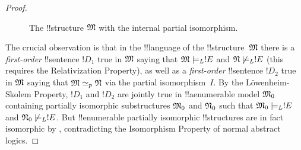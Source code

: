\documentclass[../../include/open-logic-section]{subfiles}
\begin{document}
\begin{proof}
\begin{figure}[h]
  \centering
  \caption{The !!{structure} $\mathfrak M$ with the internal
    partial isomorphism.}
\end{figure}

The crucial observation is that in the !!{language} of the
!!{structure}~$\mathfrak M$ there is a \emph{first-order} !!{sentence} $!D_1$
true in $\mathfrak M$ saying that $\mathfrak M \models_L !E$ and
$\mathfrak N \not\models_L !E$ (this requires the Relativization
Property), as well as a \emph{first-order} !!{sentence} $!D_2$ true in
$\mathfrak M$ saying that $\mathfrak M \simeq_p \mathfrak N$ via the
partial isomorphism~$I$. By the L\"owenheim-Skolem Property, $!D_1$
and $!D_2$ are jointly true in !!a{enumerable} model $\mathfrak M_0$
containing partially isomorphic substructures $\mathfrak M_0$ and
$\mathfrak N_0$ such that $\mathfrak M_0 \models_L !E$ and $\mathfrak N_0
\not\models_L !E$. But !!{enumerable} partially isomorphic !!{structure}s are
in fact isomorphic by , contradicting the
Isomorphism Property of normal abstract logics.
\end{proof}
\end{document}
